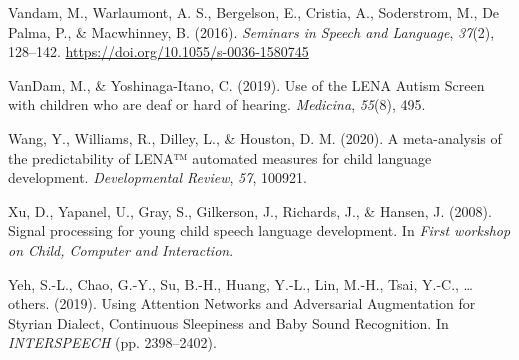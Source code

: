 \documentclass[english,,man]{apa6}
\begin{document}
\leavevmode\hypertarget{ref-vandam2016homebank}{}%
Vandam, M., Warlaumont, A. S., Bergelson, E., Cristia, A., Soderstrom, M., De Palma, P., \& Macwhinney, B. (2016). \emph{Seminars in Speech and Language}, \emph{37}(2), 128--142. \url{https://doi.org/10.1055/s-0036-1580745}

\leavevmode\hypertarget{ref-vandam2019use}{}%
VanDam, M., \& Yoshinaga-Itano, C. (2019). Use of the LENA Autism Screen with children who are deaf or hard of hearing. \emph{Medicina}, \emph{55}(8), 495.

\leavevmode\hypertarget{ref-wang2020meta}{}%
Wang, Y., Williams, R., Dilley, L., \& Houston, D. M. (2020). A meta-analysis of the predictability of LENA™ automated measures for child language development. \emph{Developmental Review}, \emph{57}, 100921.

\leavevmode\hypertarget{ref-xu2008signal}{}%
Xu, D., Yapanel, U., Gray, S., Gilkerson, J., Richards, J., \& Hansen, J. (2008). Signal processing for young child speech language development. In \emph{First workshop on Child, Computer and Interaction}.

\leavevmode\hypertarget{ref-yeh2019using}{}%
Yeh, S.-L., Chao, G.-Y., Su, B.-H., Huang, Y.-L., Lin, M.-H., Tsai, Y.-C., \ldots{} others. (2019). Using Attention Networks and Adversarial Augmentation for Styrian Dialect, Continuous Sleepiness and Baby Sound Recognition. In \emph{INTERSPEECH} (pp. 2398--2402).
\end{document}
